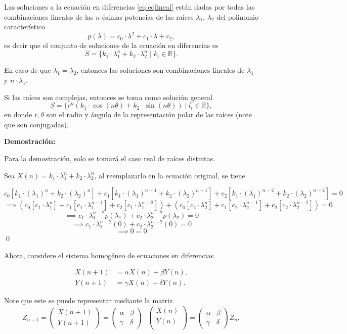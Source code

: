 \begin{theorem}
    Las soluciones a la ecuación en diferencias \ref{eq:eqlineal} están dadas por todas las combinaciones lineales de las $n$-ésimas potencias de las raíces $\lambda_1$, $\lambda_2$ del polinomio característico
    $$p(\lambda)=c_0\cdot\lambda^2 + c_1\cdot \lambda +c_2,$$
    es decir que el conjunto de soluciones de la ecuación en diferencias es
    $$S=\{k_1\cdot \lambda_1^n+k_2\cdot \lambda_2^n\;|\;k_i\in\mathbb{R}\}.$$

    En caso de que $\lambda_1=\lambda_2$, entonces las soluciones son combinaciones lineales de $\lambda_1$ y $n\cdot \lambda_1$.

    Si las raíces son complejas, entonces se toma como solución general
    $$S=\{r^n(k_1\cdot \cos(n\theta)+k_2\cdot \sin(n\theta))\;|\;l_i\in\mathbb{R}\},$$
    en donde $r,\theta$ son el radio y ángulo de la representación polar de las raíces (note que son conjugadas).
\end{theorem}

\textbf{Demostración:}

Para la demostración, solo se tomará el caso real de raíces distintas.

Sea $X(n)=k_1\cdot \lambda_1^n+k_2\cdot \lambda_2^n$, al reemplazarlo en la ecuación original, se tiene

$$c_0[k_1\cdot (\lambda_1)^n+k_2\cdot (\lambda_2)^n]+c_1[k_1\cdot (\lambda_1)^{n-1}+k_2\cdot (\lambda_2)^{n-1}]+c_2[k_1\cdot (\lambda_1)^{n-2}+k_2\cdot (\lambda_2)^{n-2}]=0$$
$$\implies (c_0[c_1\cdot \lambda_1^n]+c_1[c_1\cdot \lambda_1^{n-1}]+c_2[c_1\cdot \lambda_1^{n-2}])+(c_0[c_2\cdot \lambda_2^n]+c_1[c_2\cdot \lambda_2^{n-1}]+c_2[c_2\cdot \lambda_2^{n-2}])=0$$
$$\implies c_1\cdot\lambda_1^{n-2}p(\lambda_1)+c_2\cdot\lambda_2^{n-2}p(\lambda_2)=0$$
$$\implies c_1\cdot\lambda_1^{n-2}(0)+c_2\cdot\lambda_2^{n-2}(0)=0$$
$$\implies 0=0$$ \qed

Ahora, considere el sistema homogéneo de ecuaciones en diferencias

\begin{align}\label{eq:sisqeqdif}
    X(n+1) &= \alpha X(n) + \beta Y(n), \\
    Y(n+1) &=\gamma X(n) + \delta Y(n). \nonumber
\end{align}

Note que este se puede representar mediante la matriz 
$$Z_{n+1}=\begin{pmatrix}
    X(n+1) \\
    Y(n+1) 
    \end{pmatrix}=
    \begin{pmatrix}
    \alpha & \beta\\
    \gamma  & \delta 
    \end{pmatrix} \cdot 
    \begin{pmatrix}
    X(n) \\
    Y(n) \\
    \end{pmatrix}=
    \begin{pmatrix}
        \alpha & \beta\\
        \gamma  & \delta 
        \end{pmatrix} Z_n,$$

